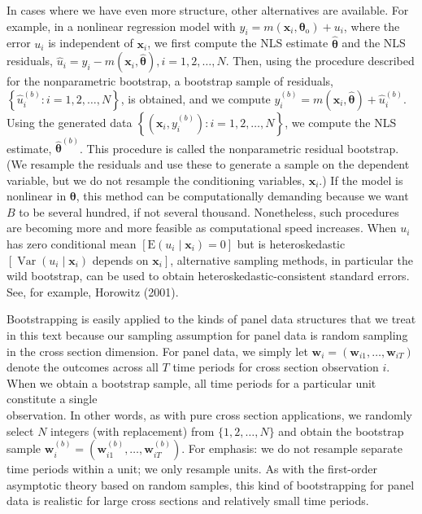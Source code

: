 \documentclass[10pt]{article}
\begin{document}
In cases where we have even more structure, other alternatives are available. For example, in a nonlinear regression model with $y_{i}=m\left(\mathbf{x}_{i}, \boldsymbol{\theta}_{\mathrm{o}}\right)+u_{i}$, where the error $u_{i}$ is independent of $\mathbf{x}_{i}$, we first compute the NLS estimate $\hat{\boldsymbol{\theta}}$ and the NLS residuals, $\hat{u}_{i}=y_{i}-m\left(\mathbf{x}_{i}, \hat{\boldsymbol{\theta}}\right), i=1,2, \ldots, N$. Then, using the procedure described for the nonparametric bootstrap, a bootstrap sample of residuals, $\left\{\hat{u}_{i}^{(b)}: i=1,2, \ldots, N\right\}$, is obtained, and we compute $y_{i}^{(b)}=m\left(\mathbf{x}_{i}, \hat{\boldsymbol{\theta}}\right)+\hat{u}_{i}^{(b)}$. Using the generated data $\left\{\left(\mathbf{x}_{i}, y_{i}^{(b)}\right): i=1,2, \ldots, N\right\}$, we compute the NLS estimate, $\hat{\boldsymbol{\theta}}^{(b)}$. This procedure is called the nonparametric residual bootstrap. (We resample the residuals and use these to generate a sample on the dependent variable, but we do not resample the conditioning variables, $\mathbf{x}_{i}$.) If the model is nonlinear in $\boldsymbol{\theta}$, this method can be computationally demanding because we want $B$ to be several hundred, if not several thousand. Nonetheless, such procedures are becoming more and more feasible as computational speed increases. When $u_{i}$ has zero conditional mean $\left[\mathrm{E}\left(u_{i} \mid \mathbf{x}_{i}\right)=0\right]$ but is heteroskedastic $\left[\operatorname{Var}\left(u_{i} \mid \mathbf{x}_{i}\right)\right.$ depends on $\left.\mathbf{x}_{i}\right]$, alternative sampling methods, in particular the wild bootstrap, can be used to obtain heteroskedastic-consistent standard errors. See, for example, Horowitz (2001).

Bootstrapping is easily applied to the kinds of panel data structures that we treat in this text because our sampling assumption for panel data is random sampling in the cross section dimension. For panel data, we simply let $\mathbf{w}_{i}=\left(\mathbf{w}_{i 1}, \ldots, \mathbf{w}_{i T}\right)$ denote the outcomes across all $T$ time periods for cross section observation $i$. When we obtain a bootstrap sample, all time periods for a particular unit constitute a single\\
observation. In other words, as with pure cross section applications, we randomly select $N$ integers (with replacement) from $\{1,2, \ldots, N\}$ and obtain the bootstrap sample $\mathbf{w}_{i}^{(b)}=\left(\mathbf{w}_{i 1}^{(b)}, \ldots, \mathbf{w}_{i T}^{(b)}\right)$. For emphasis: we do not resample separate time periods within a unit; we only resample units. As with the first-order asymptotic theory based on random samples, this kind of bootstrapping for panel data is realistic for large cross sections and relatively small time periods.
\end{document}
